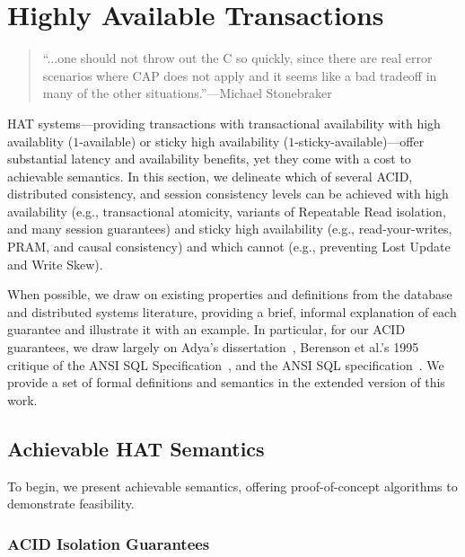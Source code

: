 
\section{Highly Available Transactions}
\label{sec:hats}

\begin{quote}
``...one should not throw out the C so quickly, since there are real
  error scenarios where CAP does not apply and it seems like a bad
  tradeoff in many of the other situations.''---Michael
  Stonebraker~\cite{stonebraker2010errors}
\end{quote}

HAT systems---providing transactions with transactional availability
with high availablity ($1$-available) or sticky high availability
($1$-sticky-available)---offer substantial latency and availability
benefits, yet they come with a cost to achievable semantics. In this
section, we delineate which of several ACID, distributed consistency,
and session consistency levels can be achieved with high availability
(e.g., transactional atomicity, variants of Repeatable Read isolation,
and many session guarantees) and sticky high availability (e.g.,
read-your-writes, PRAM, and causal consistency) and which cannot
(e.g., preventing Lost Update and Write Skew).

When possible, we draw on existing properties and definitions from the
database and distributed systems literature, providing a brief,
informal explanation of each guarantee and illustrate it with an
example. In particular, for our ACID guarantees, we draw largely on
Adya's dissertation~\cite{adya}, Berenson et al.'s 1995 critique of
the ANSI SQL Specification~\cite{ansicritique}, and the ANSI SQL
specification~\cite{ansi-sql}. We provide a set of formal definitions
and semantics in the extended version of this work.


\subsection{Achievable HAT Semantics}

To begin, we present achievable semantics, offering proof-of-concept
algorithms to demonstrate feasibility.

\subsubsection{ACID Isolation Guarantees}

